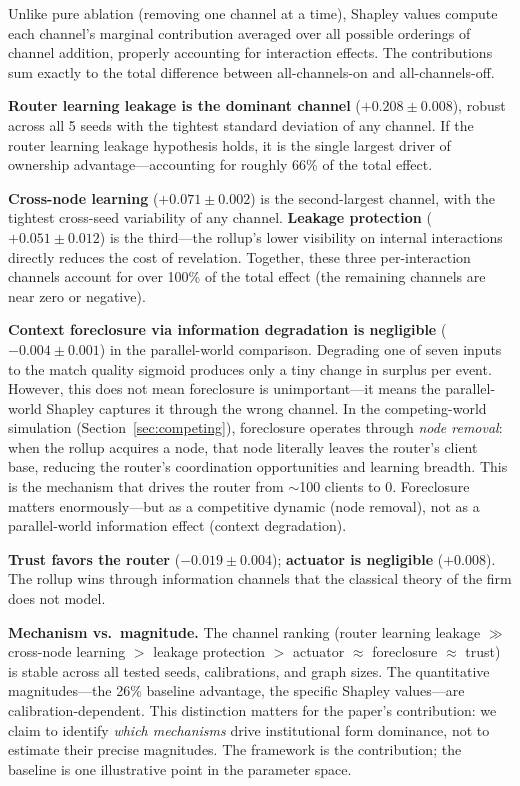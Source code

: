 \documentclass[12pt]{article}
\theoremstyle{definition}
\begin{document}
Unlike pure ablation (removing one channel at a time), Shapley values compute each channel's marginal contribution averaged over all possible orderings of channel addition, properly accounting for interaction effects. The contributions sum exactly to the total difference between all-channels-on and all-channels-off.

\textbf{Router learning leakage is the dominant channel} ($+0.208 \pm 0.008$), robust across all 5 seeds with the tightest standard deviation of any channel. If the router learning leakage hypothesis holds, it is the single largest driver of ownership advantage---accounting for roughly 66\% of the total effect.

\textbf{Cross-node learning} ($+0.071 \pm 0.002$) is the second-largest channel, with the tightest cross-seed variability of any channel. \textbf{Leakage protection} ($+0.051 \pm 0.012$) is the third---the rollup's lower visibility on internal interactions directly reduces the cost of revelation. Together, these three per-interaction channels account for over 100\% of the total effect (the remaining channels are near zero or negative).

\textbf{Context foreclosure via information degradation is negligible} ($-0.004 \pm 0.001$) in the parallel-world comparison. Degrading one of seven inputs to the match quality sigmoid produces only a tiny change in surplus per event. However, this does not mean foreclosure is unimportant---it means the parallel-world Shapley captures it through the wrong channel. In the competing-world simulation (Section~\ref{sec:competing}), foreclosure operates through \textit{node removal}: when the rollup acquires a node, that node literally leaves the router's client base, reducing the router's coordination opportunities and learning breadth. This is the mechanism that drives the router from $\sim$100 clients to 0. Foreclosure matters enormously---but as a competitive dynamic (node removal), not as a parallel-world information effect (context degradation).

\textbf{Trust favors the router} ($-0.019 \pm 0.004$); \textbf{actuator is negligible} ($+0.008$). The rollup wins through information channels that the classical theory of the firm does not model.

\textbf{Mechanism vs.\ magnitude.} The channel ranking (router learning leakage $\gg$ cross-node learning $>$ leakage protection $>$ actuator $\approx$ foreclosure $\approx$ trust) is stable across all tested seeds, calibrations, and graph sizes. The quantitative magnitudes---the 26\% baseline advantage, the specific Shapley values---are calibration-dependent. This distinction matters for the paper's contribution: we claim to identify \textit{which mechanisms} drive institutional form dominance, not to estimate their precise magnitudes. The framework is the contribution; the baseline is one illustrative point in the parameter space.
\end{document}
